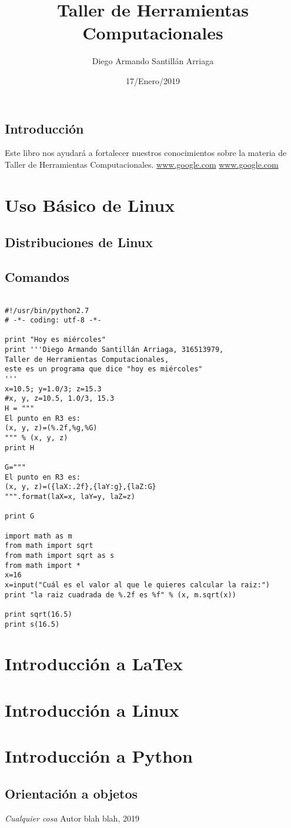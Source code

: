 \documentclass{book}
\title{Taller de Herramientas Computacionales}
\author{Diego Armando Santillán Arriaga}
\date{17/Enero/2019}
\begin{document}
\maketitle
\tableofcontents
\section*{Introducción} Este libro nos ayudará a fortalecer nuestros conocimientos sobre la materia de Taller de Herramientas Computacionales. 
\url{www.google.com}
\hyperref[Google]{www.google.com}
\chapter{Uso Básico de Linux}
\section{Distribuciones de Linux}
\section{Comandos}

\begin{verbatim}

#!/usr/bin/python2.7
# -*- coding: utf-8 -*-

print "Hoy es miércoles"
print '''Diego Armando Santillán Arriaga, 316513979,
Taller de Herramientas Computacionales,
este es un programa que dice "hoy es miércoles"
'''
x=10.5; y=1.0/3; z=15.3
#x, y, z=10.5, 1.0/3, 15.3
H = """
El punto en R3 es:
(x, y, z)=(%.2f,%g,%G)
""" % (x, y, z)
print H

G="""
El punto en R3 es:
(x, y, z)=({laX:.2f},{laY:g},{laZ:G}
""".format(laX=x, laY=y, laZ=z)

print G

import math as m
from math import sqrt
from math import sqrt as s
from math import *
x=16
x=input("Cuál es el valor al que le quieres calcular la raiz:")
print "la raiz cuadrada de %.2f es %f" % (x, m.sqrt(x))

print sqrt(16.5)
print s(16.5)

\end{verbatim}

\chapter{Introducción a LaTex}
\chapter{Introducción a Linux}
\chapter{Introducción a Python}
\section{Orientación a objetos}

\begin{thebibliography}{9}
	\textit{Cualquier cosa}
	Autor blah blah, 2019
\end{thebibliography}
\end{document}
